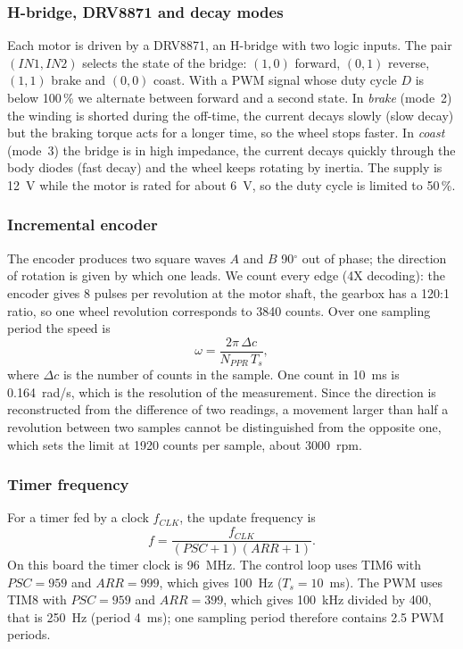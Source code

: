 \documentclass[english]{article}
\begin{document}
\subsubsection{H-bridge, DRV8871 and decay modes}

Each motor is driven by a DRV8871, an H-bridge with two logic inputs. The pair $(IN1,IN2)$ selects the state of the
bridge: $(1,0)$ forward, $(0,1)$ reverse, $(1,1)$ brake and $(0,0)$ coast. With a PWM signal whose duty cycle $D$ is
below 100\,\% we alternate between forward and a second state. In \emph{brake} (mode~2) the winding is shorted during
the off-time, the current decays slowly (slow decay) but the braking torque acts for a longer time, so the wheel stops
faster. In \emph{coast} (mode~3) the bridge is in high impedance, the current decays quickly through the body diodes
(fast decay) and the wheel keeps rotating by inertia. The supply is 12~V while the motor is rated for about 6~V, so
the duty cycle is limited to 50\,\%.

\subsubsection{Incremental encoder}

The encoder produces two square waves $A$ and $B$ 90$^\circ$ out of phase; the direction of rotation is given by which
one leads. We count every edge (4X decoding): the encoder gives 8 pulses per revolution at the motor shaft, the
gearbox has a 120:1 ratio, so one wheel revolution corresponds to 3840 counts. Over one sampling period the speed is
\begin{equation}
  \omega = \frac{2\pi\,\Delta c}{N_{PPR}\,T_s},
  \label{eq:lab2-speed}
\end{equation}
where $\Delta c$ is the number of counts in the sample. One count in 10~ms is 0.164~rad/s, which is the resolution of
the measurement. Since the direction is reconstructed from the difference of two readings, a movement larger than
half a revolution between two samples cannot be distinguished from the opposite one, which sets the limit at 1920
counts per sample, about 3000~rpm.

\subsubsection{Timer frequency}

For a timer fed by a clock $f_{CLK}$, the update frequency is
\begin{equation}
  f = \frac{f_{CLK}}{(PSC+1)(ARR+1)} .
  \label{eq:lab2-timer}
\end{equation}
On this board the timer clock is 96~MHz. The control loop uses TIM6 with $PSC=959$ and $ARR=999$, which gives 100~Hz
($T_s=10$~ms). The PWM uses TIM8 with $PSC=959$ and $ARR=399$, which gives 100~kHz divided by 400, that is 250~Hz
(period 4~ms); one sampling period therefore contains 2.5 PWM periods.
\end{document}
